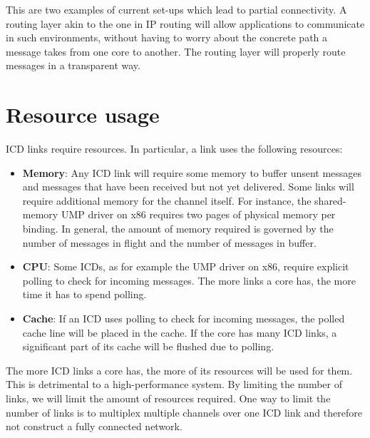 \documentclass[a4paper,twoside]{report} %
\begin{document}
This are two examples of current set-ups which lead to partial connectivity. A routing layer akin to the one in IP routing will allow applications to communicate in
such environments, without having to worry about the concrete path a message takes from one core to another. The routing layer will properly route messages in a transparent way.

\section{Resource usage}
ICD links require resources. In particular, a link uses the following resources:

\begin{itemize}
\item \textbf{Memory}: Any ICD link will require some memory to buffer unsent messages and messages that have been received but not yet delivered. Some links will require additional memory for the channel itself. For instance, the shared-memory UMP driver on x86 requires two pages of physical memory per binding. In general, the amount of memory required is governed by the number of messages in flight and
the number of messages in buffer.

\item \textbf{CPU}: Some ICDs, as for example the UMP driver on x86, require explicit polling to check for incoming messages. The more links a core has, the more time it has to spend polling.

\item \textbf{Cache}: If an ICD  uses polling to check for incoming messages, the polled cache line will be placed in the cache. If the core has many ICD links, a significant part of its cache will be flushed due to polling.

\end{itemize}

The more ICD links a core has, the more of its resources will be used for them. This is detrimental to a high-performance system. By limiting the number of links, we will limit the amount of resources required. One way to limit the number of links is to multiplex multiple channels over one ICD link and therefore not construct a fully connected network. 

\end{document}
